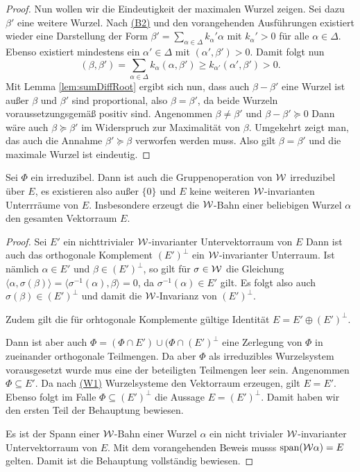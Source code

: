\begin{proof}
  Nun wollen wir die Eindeutigkeit der maximalen Wurzel zeigen.
  Sei dazu $\beta'$ eine weitere Wurzel.
  Nach \hyperref[it:B2]{(B2)} und den vorangehenden Ausführungen existiert wieder eine Darstellung der Form $\beta' = \sum_{\alpha \in \Delta} k_\alpha' \alpha$ mit $k_\alpha' > 0$ für alle $\alpha \in \Delta$.
  Ebenso existiert mindestens ein $\alpha' \in \Delta$ mit $(\alpha', \beta') > 0$.
  Damit folgt nun
  \begin{displaymath}
    (\beta, \beta') = \sum_{\alpha \in \Delta} k_\alpha (\alpha, \beta') \geq k_{\alpha'} (\alpha', \beta') > 0.
  \end{displaymath}
  Mit Lemma \ref{lem:sumDiffRoot} ergibt sich nun, dass auch $\beta - \beta'$ eine Wurzel ist außer $\beta$ und $\beta'$ sind proportional, also $\beta = \beta'$, da beide Wurzeln voraussetzungsgemäß positiv sind.
  Angenommen $\beta \neq \beta'$ und $\beta - \beta' \succeq 0$
  Dann wäre auch $\beta \succeq \beta'$ im Widerspruch zur Maximalität von $\beta$.
  Umgekehrt zeigt man, das auch die Annahme $\beta' \succeq \beta$ verworfen werden muss.
  Also gilt $\beta = \beta'$ und die maximale Wurzel ist eindeutig.
\end{proof}

\begin{lem}
  \label{lem:irreducibleGroupOp}
  Sei $\Phi$ ein irreduzibel.
  Dann ist auch die Gruppenoperation von $\mathcal{W}$ irreduzibel über $E$, es existieren also außer $\{0\}$ und $E$ keine weiteren $\mathcal{W}$\hyp{}invarianten Unterrräume von $E$.
  Insbesondere erzeugt die $\mathcal{W}$\hyp{}Bahn einer beliebigen Wurzel $\alpha$ den gesamten Vektorraum $E$.
\end{lem}

\begin{proof}
  Sei $E'$ ein nichttrivialer $\mathcal{W}$\hyp{}invarianter Untervektorraum von $E$
  Dann ist auch das orthogonale Komplement $(E')^\perp$ ein $\mathcal{W}$\hyp{}invarianter Unterraum.
  Ist nämlich $\alpha \in E'$ und $\beta \in (E')^\perp$, so gilt für $\sigma \in \mathcal{W}$ die Gleichung
  $\langle \alpha, \sigma(\beta) \rangle = \langle \sigma^{-1}(\alpha), \beta \rangle = 0$, da $\sigma^{-1}(\alpha) \in E'$ gilt.
  Es folgt also auch $\sigma(\beta) \in (E')^\perp$ und damit die $\mathcal{W}$\hyp{}Invarianz von $(E')^\perp$.

  Zudem gilt die für orhtogonale Komplemente gültige Identität $E = E' \oplus (E')^\perp$.

  Dann ist aber auch $\Phi = (\Phi \cap E') \cup (\Phi \cap (E')^\perp$ eine Zerlegung von $\Phi$ in zueinander orthogonale Teilmengen.
  Da aber $\Phi$ als irreduzibles Wurzelsystem vorausgesetzt wurde mus eine der beteiligten Teilmengen leer sein.
  Angenommen $\Phi \subseteq E'$. 
  Da nach \hyperref[it:W1]{(W1)} Wurzelsysteme den Vektorraum erzeugen, gilt $E = E'$. 
  Ebenso folgt im Falle $\Phi \subseteq (E')^\perp$ die Aussage $E = (E')^\perp$.
  Damit haben wir den ersten Teil der Behauptung bewiesen.

  Es ist der Spann einer $\mathcal{W}$\hyp{}Bahn einer Wurzel $\alpha$ ein nicht trivialer $\mathcal{W}$\hyp{}invarianter Untervektorraum von $E$.
  Mit dem vorangehenden Beweis musss $\operatorname{span}(\mathcal{W}\alpha) = E$ gelten.
  Damit ist die Behauptung vollständig bewiesen.
\end{proof}

